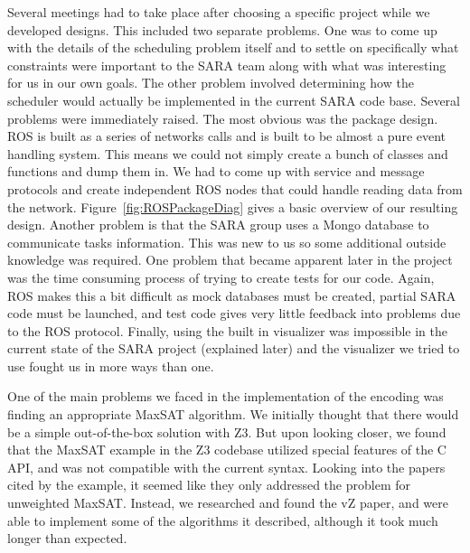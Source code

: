 \documentclass[11pt]{article}
\begin{document}
Several meetings had to take place after choosing
a specific project while we developed designs.
This included two separate problems. One was to
come up with the details of the scheduling problem
itself and to settle on specifically what constraints
were important to the SARA team along with what was
interesting for us in our own goals. The other problem
involved determining how the scheduler would actually
be implemented in the current SARA code base. Several
problems were immediately raised. The most obvious was
the package design. ROS is built as a series of networks
calls and is built to be almost a pure event handling
system. This means we could not simply create a bunch
of classes and functions and dump them in. We had to come
up with service and message protocols and create independent
ROS nodes that could handle reading data from the network.
Figure~\ref{fig:ROSPackageDiag} gives a basic overview of
our resulting design. Another problem is that the SARA group
uses a Mongo database to communicate tasks information. This
was new to us so some additional outside knowledge was
required. One problem that became apparent later in the
project was the time consuming process of trying to create
tests for our code. Again, ROS makes this a bit difficult
as mock databases must be created, partial SARA code must be
launched, and test code gives very little feedback into problems
due to the ROS protocol. Finally, using the built in visualizer
was impossible in the current state of the SARA project
(explained later) and the visualizer we tried to use fought
us in more ways than one.

One of the main problems we faced
in the implementation of the encoding
was finding an appropriate MaxSAT algorithm.
We initially thought that there would be a simple
out-of-the-box solution with Z3.
But upon looking closer,
we found that the MaxSAT example
in the Z3 codebase
utilized special features of the C API,
and was not compatible with the current syntax.
Looking into the papers cited by the example,
it seemed like they only addressed the problem
for unweighted MaxSAT.
Instead, we researched and found the vZ paper,
and were able to implement some of the algorithms
it described,
although it took much longer than expected.
\end{document}

